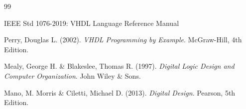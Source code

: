 \documentclass[12pt,a4paper]{article}
\begin{document}
\newpage
\begin{thebibliography}{99}

 IEEE Std 1076-2019: VHDL Language Reference Manual

 Perry, Douglas L. (2002). \textit{VHDL Programming by Example}. 
McGraw-Hill, 4th Edition.

 Mealy, George H. \& Blakeslee, Thomas R. (1997). \textit{Digital Logic 
Design and Computer Organization}. John Wiley \& Sons.

 Mano, M. Morris \& Ciletti, Michael D. (2013). \textit{Digital Design}. 
Pearson, 5th Edition.

\end{thebibliography}
\end{document}

